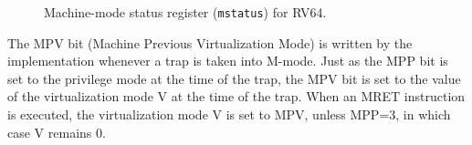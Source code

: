 \begin{figure*}[h!]
{\footnotesize
\begin{center}
\setlength{\tabcolsep}{4pt}
\end{center}
}
\vspace{-0.1in}
\caption{Machine-mode status register ({\tt mstatus}) for RV64.}
\label{hypervisor-mstatus}
\end{figure*}

The MPV bit (Machine Previous Virtualization Mode) is written by the implementation
whenever a trap is taken into M-mode.  Just as the MPP bit is set to the privilege
mode at the time of the trap, the MPV bit is set to the value of the virtualization
mode V at the time of the trap.  When an MRET instruction is executed, the
virtualization mode V is set to MPV, unless MPP=3, in which case V remains 0.


